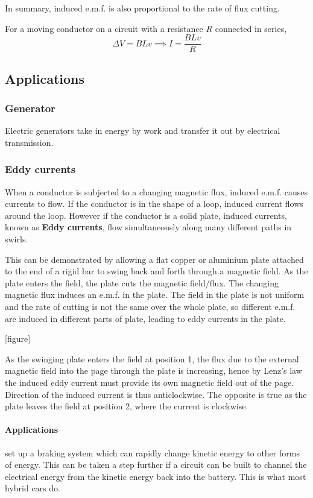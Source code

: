 In summary, induced e.m.f. is also proportional to the rate of flux cutting.

For a moving conductor on a circuit with a resistance $R$ connected in series,
\[ \Delta V = BLv \implies \boxed{I=\frac{BLv}{R}} \]
\pagebreak

\subsection{Applications}
\subsubsection{Generator}
Electric generators take in energy by work and transfer it out by electrical transmission. 

\subsubsection{Eddy currents}
When a conductor is subjected to a changing magnetic flux, induced e.m.f. causes currents to flow. If the conductor is in the shape of a loop, induced current flows around the loop. However if the conductor is a solid plate, induced currents, known as \textbf{Eddy currents}, flow simultaneously along many different paths in swirls.

This can be demonstrated by allowing a flat copper or aluminium plate attached to the end of a rigid bar to swing back and forth through a magnetic field. As the plate enters the field, the plate cuts the magnetic field/flux. The changing magnetic flux induces an e.m.f. in the plate. The field in the plate is not uniform and the rate of cutting is not the same over the whole plate, so different e.m.f. are induced in different parts of plate, leading to eddy currents in the plate.

[figure]

As the swinging plate enters the field at position 1, the flux due to the external magnetic field into the page through the plate is increasing, hence by Lenz's law the induced eddy current must provide its own magnetic field out of the page. Direction of the induced current is thus anticlockwise. The opposite is true as the plate leaves the field at position 2, where the current is clockwise.

\paragraph{Applications}
set up a braking system which can rapidly change kinetic energy to other forms of energy. This can be taken a step further if a circuit can be built to channel the electrical energy from the kinetic energy back into the battery. This is what most hybrid cars do.

